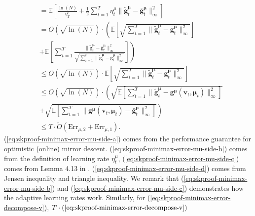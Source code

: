 \documentclass[12pt]{article}
\begin{document}
\begin{subequations}
    \begin{align}
        &= \mathbb{E} \left[ \frac{\ln(N)}{\eta_T^{\mu}} + \frac{1}{2} \sum_{t=1}^T \eta_t^{\mu} \|\tilde{\boldsymbol{g}}_t^{\boldsymbol{\mu}}  - \bar{\boldsymbol{g}}_t^{\boldsymbol{\mu}}\|_{\infty}^2 \right] \label{eq:skproof-minimax-error-mu-side-a} \\
        & = O \left (\sqrt{\ln(N)} \right ) \cdot \left( \mathbb{E}\left[ \sqrt{\sum_{t=1}^T \|\tilde{\boldsymbol{g}}_t^{\boldsymbol{\mu}}  - \bar{\boldsymbol{g}}_t^{\boldsymbol{\mu}}\|_{\infty}^2} \right] \right.  \nonumber \\
    & +  \left.   \mathbb{E} \left[ \sum_{t=1}^T \frac{\|\tilde{\boldsymbol{g}}_t^{\boldsymbol{\mu}}  - \bar{\boldsymbol{g}}_t^{\boldsymbol{\mu}}\|_{\infty}^2}{\sqrt{\sum_{i=1}^t \|\tilde{\boldsymbol{g}}^{\boldsymbol{\mu}}_i - \bar{\boldsymbol{g}}^{\boldsymbol{\mu}}_i\|_{\infty}^2}} \right ] \right) \label{eq:skproof-minimax-error-mu-side-b} \\
    & \le  O\left(\sqrt{\ln(N)} \right) \cdot \mathbb{E} \left[\sqrt{\sum_{t=1}^T \|\tilde{\boldsymbol{g}}_t^{\boldsymbol{\mu}}  - \bar{\boldsymbol{g}}_t^{\boldsymbol{\mu}}\|_{\infty}^2} \right] \label{eq:skproof-minimax-error-mu-side-c}\\
    & \le  O \left( \sqrt{\ln(N)}  \right) \cdot \left ( \sqrt{\mathbb{E} \left[\sum_{t=1}^T  \|\tilde{\boldsymbol{g}}_t^{\boldsymbol{\mu}}  - \boldsymbol{g}^{\boldsymbol{\mu}}(\boldsymbol{v}_t,\boldsymbol{\mu}_t) \|_{\infty}^2\right]} \right. \nonumber \\ 
    & + \left. \sqrt{\mathbb{E} \left[\sum_{t=1}^T  \| \boldsymbol{g}^{\boldsymbol{\mu}}(\boldsymbol{v}_t,\boldsymbol{\mu}_t) -\bar{\boldsymbol{g}}_t^{\boldsymbol{\mu}}\|_{\infty}^2\right]}  \right) \label{eq:skproof-minimax-error-mu-side-d} \\
    & \le T \cdot \tilde{O} \left( \text{Err}_{\mu,2} +  \text{Err}_{\mu,1}\right). \nonumber
    \end{align}
    \label{eq:skproof-minimax-error-mu-side}
\end{subequations}
(\ref{eq:skproof-minimax-error-mu-side-a}) comes from the performance guarantee for optimistic (online) mirror descent. (\ref{eq:skproof-minimax-error-mu-side-b}) comes from the definition of learning rate $\eta_t^{\mu}$, (\ref{eq:skproof-minimax-error-mu-side-c}) comes from Lemma 4.13 in \cite{orabona2019modern}. (\ref{eq:skproof-minimax-error-mu-side-d}) comes from Jensen inequality and triangle inequality. We remark that (\ref{eq:skproof-minimax-error-mu-side-b}) and (\ref{eq:skproof-minimax-error-mu-side-c}) demonstrates how the adaptive learning rates work. Similarly, for (\ref{eq:skproof-minimax-error-decompose-v}), $T \cdot (\ref{eq:skproof-minimax-error-decompose-v})$
\end{document}
